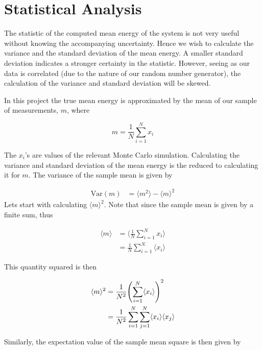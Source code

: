 \documentclass[aps,reprint,superscriptaddress,nofootinbib]{revtex4-2}
\newcommand{\Var}{\mathrm{Var}}     %
\begin{document}
\section*{Statistical Analysis}

    The statistic of the computed mean energy of the system is not very useful without knowing the accompanying uncertainty. Hence we wish to calculate the variance and the standard deviation of the mean energy. A smaller standard deviation indicates a stronger certainty in the statistic. However, seeing as our data is correlated (due to the nature of our random number generator), the calculation of the variance and standard deviation will be skewed.
    
    In this project the true mean energy is approximated by the mean of our sample of measurements, $m$, where
    
    \begin{equation*}
        m = \frac{1}{N}\sum_{i = 1}^N x_i
    \end{equation*}
    
    The $x_i$'s are values of the relevant Monte Carlo simulation.
    Calculating the variance and standard deviation of the mean energy is the reduced to calculating it for $m$. The variance of the sample mean is given by
    
    \begin{align*}
        \Var(m) &= \langle{m^2}\rangle - \langle{m}\rangle^2
    \end{align*}
    Lets start with calculating $\langle m \rangle^2$. Note that since the sample mean is given by a finite sum, thus
    
    \begin{align*}
        \langle m \rangle &= \big\langle \frac{1}{N}\sum_{i=1}^N x_i \big\rangle \\
        &= \frac{1}{N}\sum_{i=1}^N \langle x_i \rangle
    \end{align*}
    
    This quantity squared is then 
    
    \begin{align*}
        \langle m \rangle ^2 &= \frac{1}{N^2}\qty(\sum_{i=1}^N\langle x_i \rangle)^2 \\
        &= \frac{1}{N^2}\sum_{i=1}^N\sum_{j=1}^N\langle x_i \rangle \langle x_j \rangle
    \end{align*}
    
    Similarly, the expectation value of the sample mean square is then given by
    
\end{document}
